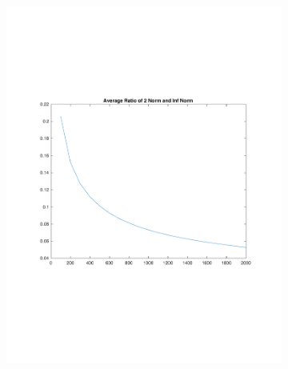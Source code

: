 \documentclass{article}
\begin{document}
\begin{figure}[H]
\begin{subfigure}{0.48\textwidth}
\includegraphics[width=\linewidth]{ratio}
\end{subfigure}


\end{figure}
\end{document}
